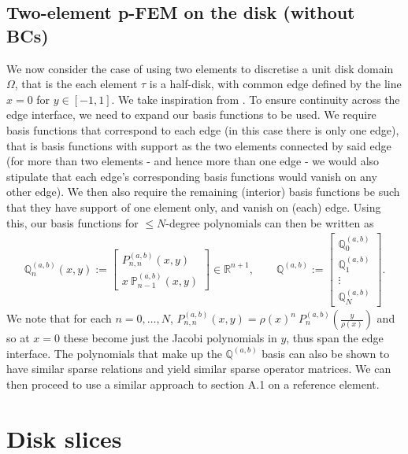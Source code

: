 \documentclass[11pt, oneside]{article}   	%
\newcommand{\R}{\mathbb{R}}
\newcommand{\bigP}{\mathbb{P}}
\newcommand{\bigPab}{\bigP^{(a,b)}}
\newcommand{\element}{\tau}
\newcommand{\bigQ}{\mathbb{Q}}
\newcommand{\bigQab}{\bigQ^{(a,b)}}
\begin{document}
\subsection{Two-element p-FEM on the disk (without BCs)}
We now consider the case of using two elements to discretise a unit disk domain $\Omega$, that is the each element $\element$ is a half-disk, with common edge defined by the line $x=0$ for $y \in [-1,1]$. We take inspiration from \cite{karniadakis2013spectral, beuchler2006new}. To ensure continuity across the edge interface, we need to expand our basis functions to be used. We require basis functions that correspond to each edge (in this case there is only one edge), that is basis functions with support as the two elements connected by said edge (for more than two elements - and hence more than one edge - we would also stipulate that each edge's corresponding basis functions would vanish on any other edge). We then also require the remaining (interior) basis functions be such that they have support of one element only, and vanish on (each) edge. Using this, our basis functions for $\le N$-degree polynomials can then be written as
\begin{align}
	\bigQab_n(x,y) := \begin{bmatrix}
		P^{(a,b)}_{n,n}(x,y) \\
		x \: \bigPab_{n-1}(x,y)
	\end{bmatrix} \in \R^{n+1}, 
	\quad \quad 
	\bigQab := \begin{bmatrix}
		\bigQab_0 \\
		\bigQab_1 \\
		\vdots \\
		\bigQab_N
	\end{bmatrix}.
\end{align}
We note that for each $n = 0,\dots,N$, $P^{(a,b)}_{n,n}(x,y) = \rho(x)^n \: P^{(a,b)}_{n}(\frac{y}{\rho(x)})$ and so at $x=0$ these become just the Jacobi polynomials in $y$, thus span the edge interface. The polynomials that make up the $\bigQab$ basis can also be shown to have similar sparse relations and yield similar sparse operator matrices. We can then proceed to use a similar approach to section A.1 on a reference element.


\section{Disk slices}
\end{document}
